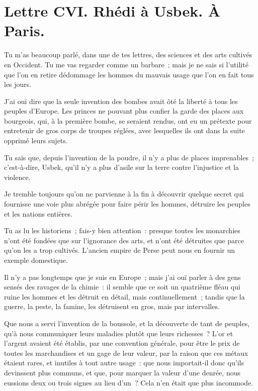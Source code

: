 \documentclass[french,twoside]{book} %
\newcommand{\dateline}[1]{\medskip{\RaggedLeft{#1}\par}\bigskip}
\begin{document}
\dateline{De Paris, le 20 de la lune de Rebiab 2, 1717.}
\section[{Lettre CVI. Rhédi à Usbek. À Paris.}]{Lettre CVI. Rhédi à Usbek. À Paris.}\renewcommand{\leftmark}{Lettre CVI. Rhédi à Usbek. À Paris.}

\noindent Tu m’as beaucoup parlé, dans une de tes lettres, des sciences et des arts cultivés en Occident. Tu me vas regarder comme un barbare ; mais je ne sais si l’utilité que l’on en retire dédommage les hommes du mauvais usage que l’on en fait tous les jours.\par
J’ai ouï dire que la seule invention des bombes avait ôté la liberté à tous les peuples d’Europe. Les princes ne pouvant plus confier la garde des places aux bourgeois, qui, à la première bombe, se seraient rendus, ont eu un prétexte pour entretenir de gros corps de troupes réglées, avec lesquelles ils ont dans la suite opprimé leurs sujets.\par
Tu sais que, depuis l’invention de la poudre, il n’y a plus de places imprenables ; c’est-à-dire, Usbek, qu’il n’y a plus d’asile sur la terre contre l’injustice et la violence.\par
Je tremble toujours qu’on ne parvienne à la fin à découvrir quelque secret qui fournisse une voie plus abrégée pour faire périr les hommes, détruire les peuples et les nations entières.\par
Tu as lu les historiens ; fais-y bien attention : presque toutes les monarchies n’ont été fondées que sur l’ignorance des arts, et n’ont été détruites que parce qu’on les a trop cultivés. L’ancien empire de Perse peut nous en fournir un exemple domestique.\par
Il n’y a pas longtemps que je suis en Europe ; mais j’ai ouï parler à des gens sensés des ravages de la chimie : il semble que ce soit un quatrième fléau qui ruine les hommes et les détruit en détail, mais continuellement ; tandis que la guerre, la peste, la famine, les détruisent en gros, mais par intervalles.\par
Que nous a servi l’invention de la boussole, et la découverte de tant de peuples, qu’à nous communiquer leurs maladies plutôt que leurs richesses ? L’or et l’argent avaient été établis, par une convention générale, pour être le prix de toutes les marchandises et un gage de leur valeur, par la raison que ces métaux étaient rares, et inutiles à tout autre usage : que nous importait-il donc qu’ils devinssent plus communs, et que, pour marquer la valeur d’une denrée, nous eussions deux ou trois signes au lieu d’un ? Cela n’en était que plus incommode.\par
\end{document}
